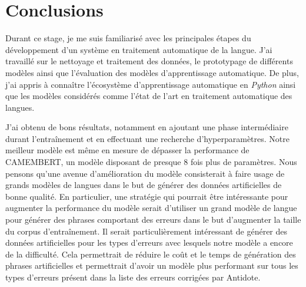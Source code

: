 \documentclass[12pt,twoside,rapport]{dms}
\theoremstyle{definition}
\numberwithin{equation}{section}
\numberwithin{table}{chapter}
\numberwithin{figure}{chapter}
\begin{document}
\chapter{Conclusions}
Durant ce stage, je me suis familiarisé avec les principales étapes du
développement d'un système en traitement automatique de la langue. J'ai
travaillé sur le nettoyage et traitement des données, le prototypage de
différents modèles ainsi que l'évaluation des modèles d'apprentissage
automatique. De plus, j'ai appris à connaître l'écosystème
d'apprentissage automatique en \textit{Python} ainsi que les modèles considérés
comme l'état de l'art en traitement automatique des langues.

J'ai obtenu de bons résultats, notamment en ajoutant une phase intermédiaire
durant l'entraînement et en effectuant une recherche d'hyperparamètres. Notre
meilleur modèle est même en mesure de dépasser la performance de CAMEMBERT, un
modèle disposant de presque 8 fois plus de paramètres. Nous pensons qu'une
avenue d'amélioration du modèle consisterait à faire usage de grands modèles de
langues dans le but de générer des données artificielles de bonne qualité. En
particulier, une stratégie qui pourrait être intéressante pour augmenter la
performance du modèle serait d'utiliser un grand modèle de langue pour générer
des phrases comportant des erreurs dans le but d'augmenter la taille du corpus
d'entraînement. Il serait particulièrement intéressant de générer des données
artificielles pour les types d'erreurs avec lesquels notre modèle a encore de
la difficulté. Cela permettrait de réduire le coût et le temps de génération
des phrases artificielles et permettrait d'avoir un modèle plus performant sur
tous les types d'erreurs présent dans la liste des erreurs corrigées par
Antidote.




\end{document}
